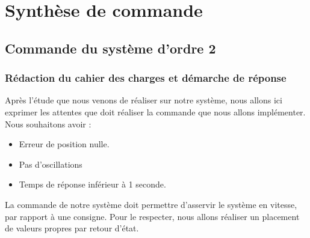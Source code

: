 \chapter{Synthèse de commande}
\label{chap:commande}
\section{Commande du système d'ordre 2}
\subsection{Rédaction du cahier des charges et démarche de réponse}
Après l'étude que nous venons de réaliser sur notre système, nous allons ici exprimer les attentes que doit réaliser la commande que nous allons implémenter. Nous souhaitons avoir : \begin{itemize} 
\item Erreur de position nulle.
\item Pas d'oscillations
\item Temps de réponse inférieur à 1 seconde.
\end{itemize}
La commande de notre système doit permettre d'asservir le système en vitesse, par rapport à une consigne. Pour le respecter, nous allons réaliser un placement de valeurs propres par retour d'état.



